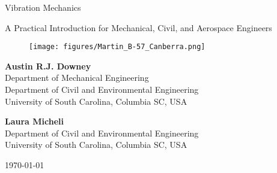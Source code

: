 \documentclass[12pt,letter]{article}
\begin{document}
\thispagestyle{firstpagestyle}

\begin{center}
	{\fontsize{50}{60}\selectfont Vibration Mechanics}
	
	\vspace{2cm}


	
	\begin{center}
	\begin{minipage}{0.75\textwidth}
		\centering
       	{\LARGE{} A Practical Introduction for Mechanical, Civil, and Aerospace Engineers}
	\end{minipage}
	\end{center}

	\vspace{2cm}
	
	\begin{figure}[H]
		\texttt{[image: figures/Martin\_B-57\_Canberra.png]}
		\label{fig:title_figure}
	\end{figure} 
	
	\vspace{3cm}
	
	\textbf{Austin R.J. Downey}\\ Department of Mechanical Engineering \\ Department of Civil and Environmental Engineering \\ University of South Carolina, Columbia SC, USA 
	
	\vspace{1cm}
	
	\textbf{Laura Micheli}\\ Department of Civil and Environmental Engineering \\ University of South Carolina, Columbia SC, USA 
	



	\vspace*{\fill}
	
	\today


\end{center}







\pagebreak
\setcounter{page}{1}
\tableofcontents
\end{document}
